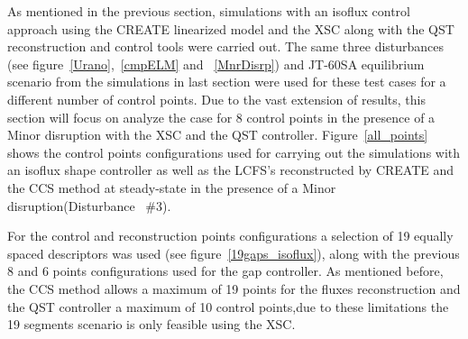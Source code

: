 As mentioned in the previous section, simulations with an isoflux control approach using the CREATE linearized model and the XSC along with the QST reconstruction and control tools were carried out. The same three disturbances (see figure~\ref{Urano},~\ref{cmpELM} and ~\ref{MnrDisrp}) and JT-60SA equilibrium scenario from the simulations in last section were used for these test cases for a different number of control points.  Due to the vast extension of results, this section will focus on analyze the case for 8 control points in the presence of a Minor disruption with the XSC and the QST controller. Figure~\ref{all_points} shows the control points configurations used for carrying out the simulations with an isoflux shape controller as well as the LCFS's reconstructed by CREATE and  the CCS method at steady-state in the presence of a Minor disruption(Disturbance~ $\#3$). 
\smallskip

For the control and reconstruction points configurations a selection of 19 equally spaced descriptors was used (see figure~\ref{19gaps_isoflux}),  along with the previous 8 and 6 points configurations used for the gap controller. As mentioned before, the CCS method allows a maximum of 19 points for the fluxes reconstruction and the QST controller a maximum of 10 control points,due to these  limitations the 19 segments scenario is only  feasible using the XSC.
\smallskip


